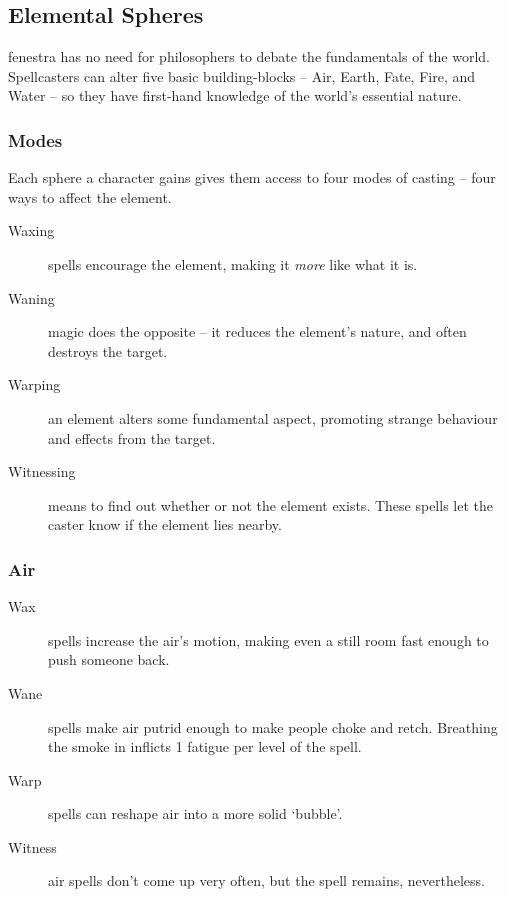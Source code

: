 \begin{multicols}{2}

\subsection{Elemental Spheres}

\Gls{fenestra} has no need for philosophers to debate the fundamentals of the world.
Spellcasters can alter five basic building-blocks -- Air, Earth, Fate, Fire, and Water -- so they have first-hand knowledge of the world's essential nature.

\subsubsection{Modes}
Each sphere a character gains gives them access to four modes of casting -- four ways to affect the element.

\begin{description}
  \item[Waxing]
  spells encourage the element, making it \emph{more} like what it is.
  \item[Waning]
  magic does the opposite -- it reduces the element's nature, and often destroys the target.
  \item[Warping]
  an element alters some fundamental aspect, promoting strange behaviour and effects from the target.
  \item[Witnessing]
  means to find out whether or not the element exists.
  These spells let the caster know if the element lies nearby.
\end{description}

\subsubsection{Air}

\begin{description}
  \item[Wax]
  spells increase the air's motion, making even a still room fast enough to push someone back.
  \item[Wane]
  spells make air putrid enough to make people choke and retch.
  Breathing the smoke in inflicts 1 \gls{fatigue} per level of the spell.
  \item[Warp]
  spells can reshape air into a more solid `bubble'.
  \item[Witness]
  air spells don't come up very often, but the spell remains, nevertheless.
\end{description}


\end{multicols}
